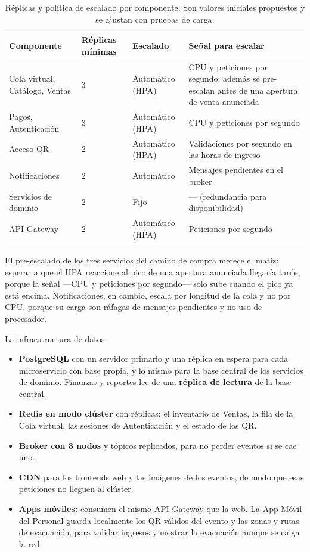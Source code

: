 \begin{center}
\begin{longtable}{p{4.6cm}p{1.8cm}p{3.1cm}p{4.6cm}}
\toprule
\textbf{Componente} & \textbf{Réplicas mínimas} & \textbf{Escalado} & \textbf{Señal para escalar}\\
\midrule
\endhead
Cola virtual, Catálogo, Ventas & 3 & Automático (HPA) & CPU y peticiones por segundo; además se
pre-escalan antes de una apertura de venta anunciada\\[0.3em]
Pagos, Autenticación & 3 & Automático (HPA) & CPU y peticiones por segundo\\[0.3em]
Acceso QR & 2 & Automático (HPA) & Validaciones por segundo en las horas de ingreso\\[0.3em]
Notificaciones & 2 & Automático & Mensajes pendientes en el broker\\[0.3em]
Servicios de dominio & 2 & Fijo & --- (redundancia para disponibilidad)\\[0.3em]
API Gateway & 2 & Automático (HPA) & Peticiones por segundo\\
\bottomrule
\caption{Réplicas y política de escalado por componente. Son valores iniciales propuestos y se
ajustan con pruebas de carga.}
\label{tab:replicas}
\end{longtable}
\end{center}

El pre-escalado de los tres servicios del camino de compra merece el matiz: esperar a que el HPA
reaccione al pico de una apertura anunciada llegaría tarde, porque la señal ---CPU y peticiones por
segundo--- solo sube cuando el pico ya está encima. Notificaciones, en cambio, escala por longitud
de la cola y no por CPU, porque su carga son ráfagas de mensajes pendientes y no uso de procesador.

La infraestructura de datos:

\begin{itemize}
\item \textbf{PostgreSQL} con un servidor primario y una réplica en espera para cada microservicio
      con base propia, y lo mismo para la base central de los servicios de dominio. Finanzas y
      reportes lee de una \textbf{réplica de lectura} de la base central.
\item \textbf{Redis en modo clúster} con réplicas: el inventario de Ventas, la fila de la Cola
      virtual, las sesiones de Autenticación y el estado de los QR.
\item \textbf{Broker con 3 nodos} y tópicos replicados, para no perder eventos si se cae uno.
\item \textbf{CDN} para los frontends web y las imágenes de los eventos, de modo que esas
      peticiones no lleguen al clúster.
\item \textbf{Apps móviles:} consumen el mismo API Gateway que la web. La App Móvil del Personal
      guarda localmente los QR válidos del evento y las zonas y rutas de evacuación, para validar
      ingresos y mostrar la evacuación aunque se caiga la red.
\end{itemize}

